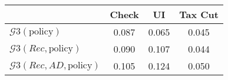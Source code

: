 \begin{tabular}{@{}lccc@{}} 
\toprule 
                          & Check      & UI    & Tax Cut    \\  \midrule 
$\mathcal{G}3(\text{policy})$ & 0.087  & 0.065  & 0.045     \\ 
$\mathcal{G}3(Rec,\text{policy})$ & 0.090  & 0.107  & 0.044     \\ 
$\mathcal{G}3(Rec, AD,\text{policy})$ & 0.105  & 0.124  & 0.050     \\ 
\end{tabular}  
